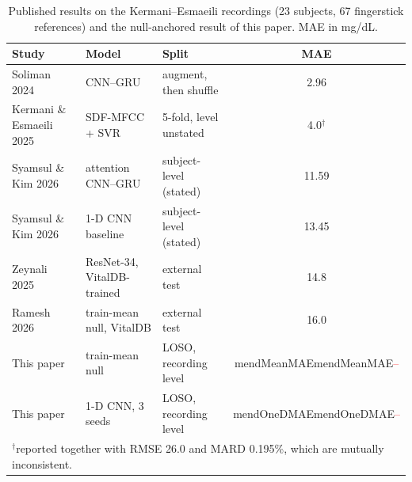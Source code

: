 \documentclass[journal,onecolumn]{IEEEtran}
\newcommand{\m}[1]{\ifcsname #1\endcsname\csname #1\endcsname\else\textcolor{red}{--}\fi}
\begin{document}
\begin{table}[h!]
  \caption{Published results on the Kermani--Esmaeili recordings (23 subjects,
           67 fingerstick references) and the null-anchored result of this
           paper.  MAE in mg/dL.}
  \label{tab:prior}
  \centering
  \scriptsize
  \setlength{\tabcolsep}{2.5pt}
  \begin{tabular}{@{}p{2.45cm}p{2.1cm}p{2.3cm}c@{}}
    \toprule
    \textbf{Study} & \textbf{Model} & \textbf{Split} & \textbf{MAE} \\
    \midrule
    Soliman 2024~\cite{soliman2024} & CNN--GRU & augment, then shuffle & 2.96 \\
    Kermani \& Esmaeili 2025~\cite{kermani2025} & SDF-MFCC + SVR & 5-fold, level unstated & 4.0$^\dagger$ \\
    Syamsul \& Kim 2026~\cite{syamsul2026} & attention CNN--GRU & subject-level (stated) & 11.59 \\
    Syamsul \& Kim 2026~\cite{syamsul2026} & 1-D CNN baseline & subject-level (stated) & 13.45 \\
    Zeynali 2025~\cite{zeynali2025} & ResNet-34, VitalDB-trained & external test & 14.8 \\
    Ramesh 2026~\cite{ramesh2026} & train-mean null, VitalDB & external test & 16.0 \\
    \midrule
    This paper & train-mean null & LOSO, recording level & \m{mendMeanMAE} \\
    This paper & 1-D CNN, 3 seeds & LOSO, recording level & \m{mendOneDMAE} \\
    \bottomrule
    \multicolumn{4}{p{0.95\columnwidth}}{$^\dagger$reported together with RMSE 26.0 and MARD 0.195\%, which are mutually inconsistent.}
  \end{tabular}
\end{table}
\end{document}
